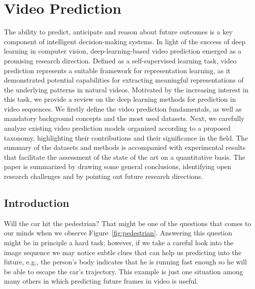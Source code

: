 \chapter{Video Prediction}
\label{cha:videoprediction}

\begin{chapterabstract}
The ability to predict, anticipate and reason about future outcomes is a key component of intelligent decision-making systems. In light of the success of deep learning in computer vision, deep-learning-based video prediction emerged as a promising research direction. Defined as a self-supervised learning task, video prediction represents a suitable framework for representation learning, as it demonstrated potential capabilities for extracting meaningful representations of the underlying patterns in natural videos. Motivated by the increasing interest in this task, we provide a review on the deep learning methods for prediction in video sequences. We firstly define the video prediction fundamentals, as well as mandatory background concepts and the most used datasets. Next, we carefully analyze existing video prediction models organized according to a proposed taxonomy, highlighting their contributions and their significance in the field. The summary of the datasets and methods is accompanied with experimental results that facilitate the assessment of the state of the art on a quantitative basis. The paper is summarized by drawing some general conclusions, identifying open research challenges and by pointing out future research directions.
\end{chapterabstract}

\minitoc

\clearpage

\section{Introduction}
\label{cha:videoprediction:sec:introduction}

Will the car hit the pedestrian? That might be one of the questions that comes to our minds when we observe Figure~\ref{fig:pedestrian}. Answering this question might be in principle a hard task; however, if we take a careful look into the image sequence we may notice subtle clues that can help us predicting into the future, e.g., the person's body indicates that he is running fast enough so he will be able to escape the car's trajectory. This example is just one situation among many others in which predicting future frames in video is useful.

